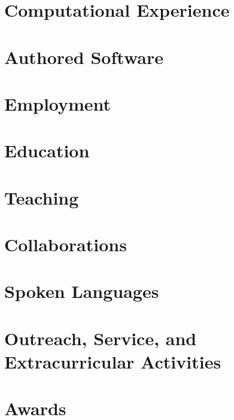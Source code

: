 \documentclass[10pt,letterpaper,roman]{moderncv} %
\begin{document}
% 
\makecvtitle %

\section{Computational Experience}


\section{Authored Software}


\section{Employment}


\section{Education}


\section{Teaching}


\section{Collaborations}


\section{Spoken Languages}


\section{Outreach, Service, and Extracurricular Activities}


\section{Awards}



\end{document}
